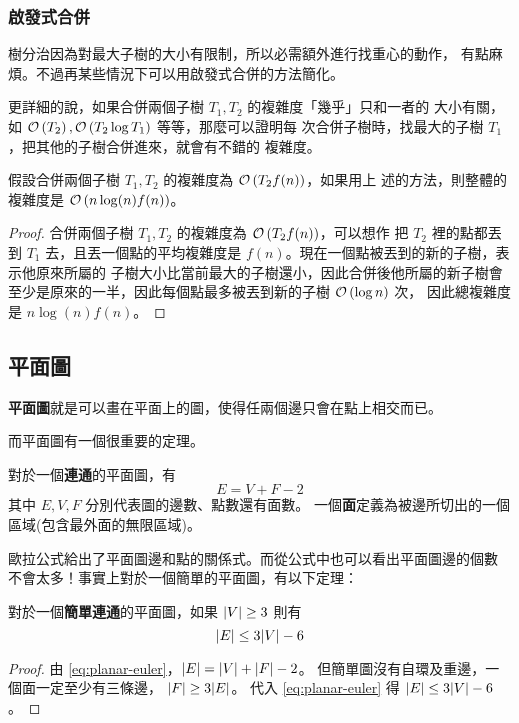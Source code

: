 \documentclass[a4paper,12pt]{book}
\begin{document}
\subsubsection{啟發式合併}
樹分治因為對最大子樹的大小有限制，所以必需額外進行找重心的動作，
有點麻煩。不過再某些情況下可以用啟發式合併的方法簡化。

更詳細的說，如果合併兩個子樹 $T_1, T_2$ 的複雜度「幾乎」只和一者的
大小有關，如 $\operatorname{\mathcal{O}}\left(T_2\right), \operatorname{\mathcal{O}}\left(T_2 \log T_1\right)$ 等等，那麼可以證明每
次合併子樹時，找最大的子樹 $T_1$，把其他的子樹合併進來，就會有不錯的
複雜度。

\begin{theorem}
  假設合併兩個子樹 $T_1, T_2$ 的複雜度為 $\operatorname{\mathcal{O}}\left(T_2 f(n)\right)$，如果用上
  述的方法，則整體的複雜度是 $\operatorname{\mathcal{O}}\left(n \log(n) f(n)\right)$。
\end{theorem}
\begin{proof}
  合併兩個子樹 $T_1, T_2$ 的複雜度為 $\operatorname{\mathcal{O}}\left(T_2 f(n)\right)$，可以想作
  把 $T_2$ 裡的點都丟到 $T_1$ 去，且丟一個點的平均複雜度是
  $f(n)$。現在一個點被丟到的新的子樹，表示他原來所屬的
  子樹大小比當前最大的子樹還小，因此合併後他所屬的新子樹會
  至少是原來的一半，因此每個點最多被丟到新的子樹 $\operatorname{\mathcal{O}}\left(\log n\right)$ 次，
  因此總複雜度是 $n \log(n) f(n)$。
\end{proof}

\subsection{平面圖}
{\bf 平面圖}就是可以畫在平面上的圖，使得任兩個邊只會在點上相交而已。

而平面圖有一個很重要的定理。
\begin{theorem}[定理 (歐拉定理)]
  對於一個{\bf 連通}的平面圖，有
  \begin{equation}
    E = V + F - 2 \label{eq:planar-euler}
  \end{equation}
  其中 $E, V, F$ 分別代表圖的邊數、點數還有面數。
  一個{\bf 面}定義為被邊所切出的一個區域(包含最外面的無限區域)。
\end{theorem}
歐拉公式給出了平面圖邊和點的關係式。而從公式中也可以看出平面圖邊的個數
不會太多！事實上對於一個簡單的平面圖，有以下定理：
\begin{theorem}[定理]
  對於一個{\bf 簡單連通}的平面圖，如果 $\lvert V \rvert \geq 3$ 則有
  \begin{equation}
    \lvert E \rvert \leq 3\lvert V \rvert - 6 \label{eq:planar-2}
  \end{equation}
\end{theorem}
\begin{proof}
  由 \eqref{eq:planar-euler}，$\lvert E \rvert = \lvert V \rvert + \lvert F \rvert - 2$。
  但簡單圖沒有自環及重邊，一個面一定至少有三條邊， $\lvert F \rvert \geq 3 \lvert E \rvert$。
  代入 \eqref{eq:planar-euler} 得 $\lvert E \rvert \leq 3 \lvert V \rvert - 6$。
\end{proof}
\end{document}
